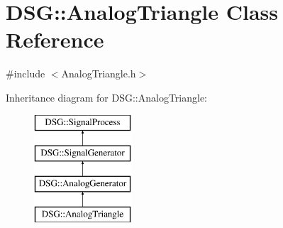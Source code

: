 \hypertarget{classDSG_1_1AnalogTriangle}{\section{D\+S\+G\+:\+:Analog\+Triangle Class Reference}
\label{classDSG_1_1AnalogTriangle}
}


{\ttfamily \#include $<$Analog\+Triangle.\+h$>$}

Inheritance diagram for D\+S\+G\+:\+:Analog\+Triangle\+:\begin{figure}[H]
\begin{center}
\leavevmode
\includegraphics[height=4.000000cm]{classDSG_1_1AnalogTriangle}
\end{center}
\end{figure}
